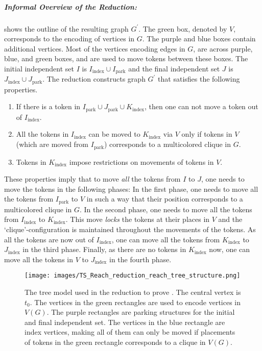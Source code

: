 \subparagraph*{Informal Overview of the Reduction:}
 shows the outline of the resulting graph $G^{\prime}$.
The green box, denoted by $V$, corresponds to the encoding of vertices in $G$.
The purple and blue boxes contain additional vertices.
Most of the vertices encoding edges in $G$,
are across purple, blue, and green boxes,
and are used to move tokens between these boxes.
The initial independent set $I$ is
$I_{\text{index}}\cup I_{\text{park}}$ and
the final independent set $J$ is
$J_{\text{index}}\cup J_{\text{park}}$.
The reduction constructs graph $G^\prime$ that satisfies
the following properties.
\begin{enumerate}
\item If there is a token in
$I_{\text{park}} \cup J_{\text{park}} \cup K_{\text{index}}$,
then one can not move a token out of $I_{\text{index}}$.
\item {All} the tokens in $I_{\text{index}}$ can be
moved to $K_{\text{index}}$ via $V$ only if
tokens in $V$ (which are moved from $I_{\text{park}}$)
corresponds to a multicolored clique in $G$.
\item Tokens in $K_{\text{index}}$ impose restrictions on movements of tokens in $V$.
\end{enumerate}
These properties imply that to move \emph{all} the tokens
from $I$ to $J$, one needs to move the tokens in the following phases:
In the first phase, one needs to move
all the tokens from $I_{\text{park}}$
to $V$ in such a way that their position corresponds to
a multicolored clique in $G$.
In the second phase, one needs to move all the tokens from
$I_{\text{index}}$ to $K_{\text{index}}$.
This move \emph{locks} the tokens at their places in $V$
and the `clique'-configuration is maintained throughout the movements
of the tokens.
As all the tokens are now out of $I_{\text{index}}$,
one can move all the tokens from
$K_{\text{index}}$ to $J_{\text{index}}$ in the third phase.
Finally, as there are no tokens in $K_{\text{index}}$ now,
one can move all the tokens in $V$ to $J_{\text{index}}$
in the fourth phase.

\begin{figure}[t]
\centering
\texttt{[image: images/TS\_Reach\_reduction\_reach\_tree\_structure.png]}
\caption{The tree model used in the reduction to prove . The central vertex is $t_0$.
The vertices in the green rectangles are used to encode vertices
in $V(G)$.
The purple rectangles are parking structures for the initial and final
independent set.
The vertices in the blue rectangle are index vertices, making
all of them can only be moved if placements of tokens in
the green rectangle corresponds to a clique in $V(G)$.}
\label{fig:TS-Reach-reduction-reach-tree-structure}
\vspace{-5mm}
\end{figure}

